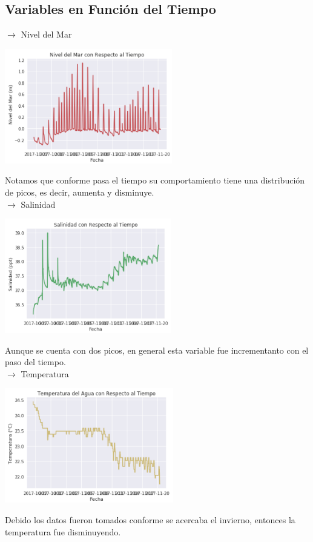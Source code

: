 \documentclass[12pt]{article}
\begin{document}
\subsection*{Variables en Función del Tiempo}
$\rightarrow$ Nivel del Mar
\begin{center}
	\includegraphics[height=5cm]{gd1.png}
\end{center}
Notamos que conforme pasa el tiempo su comportamiento tiene una distribución de picos, es decir, aumenta y disminuye.\\
\newpage
$\rightarrow$ Salinidad
\begin{center}
	\includegraphics[height=5cm]{gd2.png}
\end{center}
Aunque se cuenta con dos picos, en general esta variable fue incrementanto con el paso del tiempo.\\

$\rightarrow$ Temperatura
\begin{center}
	\includegraphics[height=5cm]{gd3.png}
\end{center}
Debido los datos fueron tomados conforme se acercaba el invierno, entonces la temperatura fue disminuyendo.\\
\end{document}
